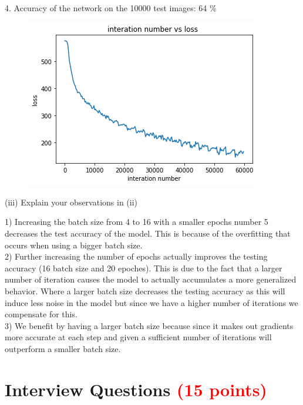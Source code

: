 \documentclass[answers]{exam}
\newcommand{\mypoints}[1]{\textcolor{red}{(#1 points)}}
\begin{document}
\begin{solution}
\begin{figure}[H]
\end{figure}
\\
4. Accuracy of the network on the 10000 test images: 64 \%
\begin{figure}[H]
    \centering
    \includegraphics[width=0.9\linewidth]{Images/gpu4.png}
\end{figure}
\end{solution}
(iii) Explain your observations in (ii) 
\begin{solution}
1) Increasing the batch size from 4 to 16 with a smaller epochs number 5 decreases the test accuracy of the model. This is because of the overfitting that occurs when using a bigger batch size.\\
2) Further increasing the number of epochs actually improves the testing accuracy (16 batch size and 20 epoches). This is due to the fact that a larger number of iteration causes the model to actually accumulates a more generalized behavior. Where a larger batch size decreases the testing accuracy as this will induce less noise in the model but since we have a higher number of iterations we compensate for this.\\
3) We benefit by having a larger batch size because since it makes out gradients more accurate at each step and given a sufficient number of iterations will outperform a smaller batch size.
\end{solution}

\section{Interview Questions \mypoints{15}}
\end{document}
